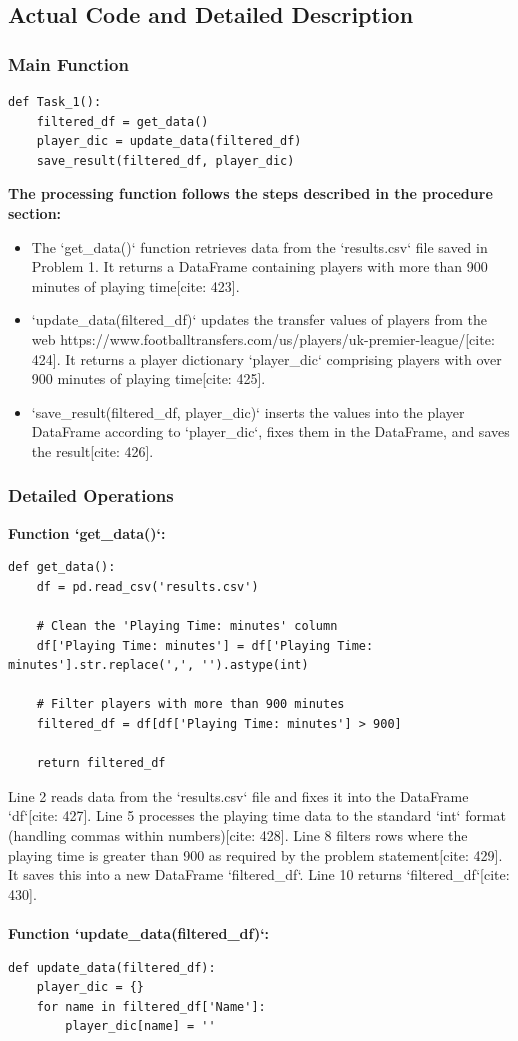 \documentclass[12pt]{report}
\begin{document}
{{{\subsection{Actual Code and Detailed Description}
\subsubsection{Main Function}
\begin{lstlisting}
def Task_1():
    filtered_df = get_data()
    player_dic = update_data(filtered_df)
    save_result(filtered_df, player_dic)
\end{lstlisting}
\textbf{The processing function follows the steps described in the procedure section:}
\begin{itemize}
    \item The `get\_data()` function retrieves data from the `results.csv` file saved in Problem 1. It returns a DataFrame containing players with more than 900 minutes of playing time[cite: 423].
    \item `update\_data(filtered\_df)` updates the transfer values of players from the web https://www.footballtransfers.com/us/players/uk-premier-league/[cite: 424]. It returns a player dictionary `player\_dic` comprising players with over 900 minutes of playing time[cite: 425].
    \item `save\_result(filtered\_df, player\_dic)` inserts the values into the player DataFrame according to `player\_dic`, fixes them in the DataFrame, and saves the result[cite: 426].
\end{itemize}
\subsubsection{Detailed Operations}
\textbf{Function `get\_data()`:}
\begin{lstlisting}
def get_data():
    df = pd.read_csv('results.csv')

    # Clean the 'Playing Time: minutes' column
    df['Playing Time: minutes'] = df['Playing Time: minutes'].str.replace(',', '').astype(int)

    # Filter players with more than 900 minutes
    filtered_df = df[df['Playing Time: minutes'] > 900]

    return filtered_df
\end{lstlisting}
Line 2 reads data from the `results.csv` file and fixes it into the DataFrame `df`[cite: 427].
Line 5 processes the playing time data to the standard `int` format (handling commas within numbers)[cite: 428].
Line 8 filters rows where the playing time is greater than 900 as required by the problem statement[cite: 429]. It saves this into a new DataFrame `filtered\_df`. Line 10 returns `filtered\_df`[cite: 430].\\\\
\textbf{Function `update\_data(filtered\_df)`:}\\
\begin{lstlisting}
def update_data(filtered_df):
    player_dic = {}
    for name in filtered_df['Name']:
        player_dic[name] = ''


\end{lstlisting}}}}
\end{document}
